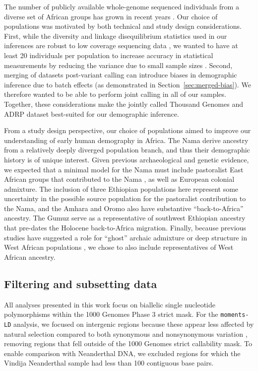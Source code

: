 \documentclass[]{article}
\begin{document}
The number of publicly available whole-genome sequenced individuals from a
diverse set of African groups has grown in recent years
\citep[e.g.,][]{Mallick2016-lx,Bergstrom2020-cy,Schlebusch2020-zo}. Our choice
of populations was motivated by both technical and study design considerations.
First, while the diversity and linkage disequilibrium statistics used in our
inferences are robust to low coverage sequencing data \citep{Ragsdale2019-nt},
we wanted to have at least 20 individuals per population to increase accuracy
in statistical measurements by reducing the variance due to small sample sizes
\citep{Ragsdale2020-nz}. Second, merging of datasets post-variant calling can
introduce biases in demographic inference due to batch effects (as demonstrated
in Section~\ref{sec:merged-bias}). We therefore wanted to be able to perform
joint calling in all of our samples. Together, these considerations make the
jointly called Thousand Genomes and ADRP dataset best-suited for our
demographic inference.

From a study design perspective, our choice of populations aimed to improve our
understanding of early human demography in Africa. The Nama derive ancestry
from a relatively deeply diverged population branch, and thus their demographic
history is of unique interest. Given previous archaeological and genetic
evidence, we expected that a minimal model for the Nama must include
pastoralist East African groups that contributed to the Nama
\citep[e.g.,][]{Uren2016-nn}, as well as European colonial admixture.  The
inclusion of three Ethiopian populations here represent some uncertainty in the
possible source population for the pastoralist contribution to the Nama, and
the Amhara and Oromo also have substantive ``back-to-Africa'' ancestry. The
Gumuz serve as a representative of southwest Ethiopian ancestry that pre-dates
the Holocene back-to-Africa migration. Finally, because previous studies have
suggested a role for ``ghost'' archaic admixture or deep structure in West
African populations \citep[e.g.,][]{Speidel2019-nj,Durvasula2020-td}, we chose
to also include representatives of West African ancestry.

\subsection{Filtering and subsetting data}\label{sec:filtering}

All analyses presented in this work focus on biallelic single nucleotide
polymorphisms within the 1000 Genomes Phase 3 strict mask.  For the
\texttt{moments-LD} analysis, we focused on intergenic regions because these
appear less affected by natural selection compared to both synonymous and
nonsynonymous variation \citep{Ragsdale2018-dd}, removing regions that fell
outside of the 1000 Genomes strict callability mask. To enable comparison with
Neanderthal DNA, we excluded regions for which the Vindija Neanderthal sample
had less than 100 contiguous base pairs.
\end{document}
